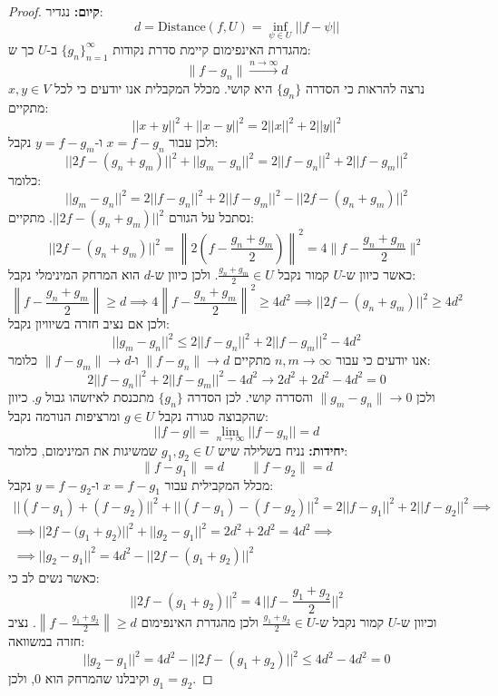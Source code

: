 \documentclass{tstextbook}
\begin{document}
\begin{proof}
\textbf{קיום:} נגדיר:
$$d= \text{Distance}(f,U)=\operatorname*{inf}_{\psi\in U}||f-\psi||$$
מהגדרת האינפימום קיימת סדרת נקודות \(\{ g_{n} \}_{n=1}^{\infty}\) ב-\(U\) כך ש:
$$\lVert f-g_{n} \rVert \xrightarrow{n\to \infty} d$$
נרצה להראות כי הסדרה \(\{ g_{n} \}\) היא קושי. מכלל המקבלית אנו יודעים כי לכל \(x,y \in V\) מתקיים:
$$||x+y||^{2}+||x-y||^{2}=2||x||^{2}+2||y||^{2}$$
ולכן עבור \(x=f-g_{n}\) ו-\(y=f-g_{m}\) נקבל:
$$||2f-(g_{n}+g_{m})||^{2}+||g_{m}-g_{n}||^{2}=2||f-g_{n}||^{2}+2||f-g_{m}||^{2}$$
כלומר:
$$||g_{m}-g_{n}||^{2}=2||f-g_{n}||^{2}+2||f-g_{m}||^{2}-||2f-\left(g_{n}+g_{m}\right)||^{2}$$
נסתכל על הגורם \(||2f-\left(g_{n}+g_{m}\right)||^{2}\). מתקיים:
$$||2f-(g_{n}+g_{m})||^{2}=\left\lVert 2\left(f-{\frac{g_{n}+g_{m}}{2}}\right)\right\lVert^{2}=4\lVert f-{\frac{g_{n}+g_{m}}{2}} \rVert ^{2}$$
כאשר כיוון ש-\(U\) קמור נקבל \(\frac{g_{n}+g_{m}}{2}\in U\). ולכן כיוון ש-\(d\) הוא המרחק המינימלי נקבל:
$$\left\lVert f-{\frac{g_{n}+g_{m}}{2}}\right\rVert \geq d\implies4\left\lVert f-{\frac{g_{n}+g_{m}}{2}}\right\rVert ^{2}\geq4d^{2}\implies||2f-(g_{n}+g_{m})||^{2}\geq4d^{2}$$
ולכן אם נציב חזרה בשיוויון נקבל:
$$||g_{m}-g_{n}||^{2}\leq2||f-g_{n}||^{2}+2||f-g_{m}||^{2}-4d^{2}$$
אנו יודעים כי עבור \(n,m\to \infty\) מתקיים \(\lVert f-g_{n} \rVert\to d\) ו-\(\lVert f-g_{m} \rVert\to d\) כלומר:
$$2||f-g_{n}||^{2}+2||f-g_{m}||^{2}-4d^{2}\to2d^{2}+2d^{2}-4d^{2}=0$$
ולכן \(\lVert g_{m}-g_{n} \rVert\to 0\) והסדרה קושי. לכן הסדרה \(\{ g_{n} \}\) מתכנסת לאיזשהו גבול \(g\). כיוון שהקבוצה סגורה נקבל \(g \in U\) ומרציפות הנורמה נקבל:
$$||f-g||=\operatorname*{lim}_{n\to\infty}||f-g_{n}||=d$$\textbf{יחידות:}
נניח בשלילה שיש \(g_{1},g_{2} \in U\) שמשיגות את המינימום, כלומר:
$$\lVert f-g_{1} \rVert=d\qquad \lVert f-g_{2} \rVert=d$$
מכלל המקבילית עבור \(x=f-g_{1}\) ו-\(y=f-g_{2}\) נקבל:
\begin{gather*}||(f-g_{1})+(f-g_{2})||^{2}+||(f-g_{1})-(f-g_{2})||^{2}=2||f-g_{1}||^{2}+2||f-g_{2}||^{2}\implies\\\implies||2f-{\big(}g_{1}+g_{2}{\big)}||^{2}+||g_{2}-g_{1}||^{2}=2d^{2}+2d^{2}=4d^{2}\implies \\ \implies ||g_{2}-g_{1}||^{2}=4d^{2}-||2f-(g_{1}+g_{2})||^{2}
\end{gather*}
כאשר נשים לב כי:
$$||2f-(g_{1}+g_{2})||^{2}=4\,||f-{\textstyle\frac{g_{1}+g_{2}}{2}}||^{2}$$
וכיוון ש-\(U\) קמור נקבל ש-\(\frac{g_{1}+g_{2}}{2}\in U\) ולכן מהגדרת האינפימום \(\left\lVert f-{\frac{g_{1}+g_{2}}{2}}\right\rVert \geq d\). נציב חזרה במשוואה:
$$||g_{2}-g_{1}||^{2}=4d^{2}-||2f-(g_{1}+g_{2})||^{2}\leq4d^{2}-4d^{2}=0$$
וקיבלנו שהמרחק הוא 0, ולכן \(g_{1}=g_{2}\).

\end{proof}
\end{document}
